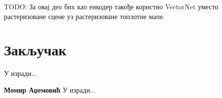 \documentclass[11pt,oneside]{memoir}
\begin{document}
TODO: За овај део бих као енкодер такође користио VectorNet уместо растеризоване сцене уз растеризоване топлотне мапе. 

\chapter{Закључак}
У изради...

\backmatter




\begin{biografija}
\textbf{Момир Аџемовић} 
У изради...
\end{biografija}
\end{document}
